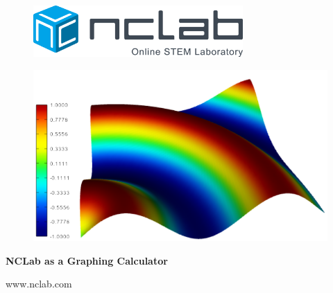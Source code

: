 \documentclass{article}
\begin{document}
\large

\vbox{}
\begin{figure}[!ht]
\includegraphics[width=8cm]{img/logo.png}
\vspace{12mm}
\end{figure}

\begin{figure}[!ht]
\begin{center}
\includegraphics[width=14cm]{img/webgl.png}
\vspace{16mm}
\end{center}
\end{figure}

\centerline{\Huge \bf NCLab as a Graphing Calculator}

\vfill

\centerline{\Large www.nclab.com}

\newpage




\section*{}
\small


\end{document}
